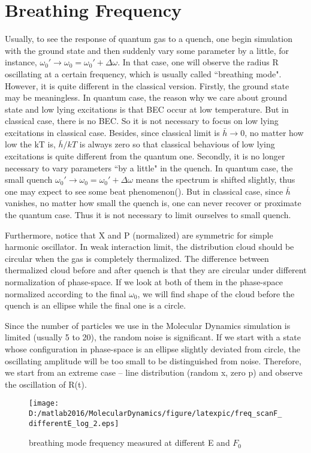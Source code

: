 \documentclass[aps,pre,twocolumn
,groupedaddress]{revtex4-1}
\begin{document}
\begin{comment}
\begin{figure}[hbtp]
\centering
\texttt{[image: D:/matlab2016/MolecularDynamics/figure/Eg1.eps]}
\caption{ground state Energy with $F_0$}
\end{figure}
\end{comment}

\newpage
\section{Breathing Frequency}
Usually, to see the response of quantum gas to a quench, one begin simulation with the ground state and then suddenly vary some parameter by a little, for instance, $\omega_0'\rightarrow\omega_0=\omega_0'+\Delta\omega$. In that case, one will observe the radius R oscillating at a certain frequency, which is usually called ``breathing mode".
However, it is quite different in the classical version. Firstly, the ground state may be meaningless. In quantum case, the reason why we care about ground state and low lying excitations is that BEC occur at low temperature. But in classical case, there is no BEC. So it is not necessary to focus on low lying excitations in classical case. Besides, since classical limit is $\bar{h}\rightarrow 0$, no matter how low the kT is, $\bar{h}/kT$ is always zero so that classical behavious of low lying excitations is quite different from the quantum one. Secondly, it is no longer necessary to vary parameters ``by a little" in the quench. In quantum case, the small quench $\omega_0'\rightarrow\omega_0=\omega_0'+\Delta\omega$ means the spectrum is shifted slightly, thus one may expect to see some beat phenomenon({\color{red}{?}}). But in classical case, since $\bar{h}$ vanishes, no matter how small the quench is, one can never recover or proximate the quantum case. Thus it is not necessary to limit ourselves to small quench. 

Furthermore, notice that X and P (normalized) are symmetric for simple harmonic oscillator. In weak interaction limit, the distribution cloud should be circular when the gas is completely thermalized. The difference between thermalized cloud before and after quench is that they are circular under different normalization of phase-space. If we look at both of them in the phase-space normalized according to the final $\omega_0$, we will find shape of the cloud before the quench is an ellipse while the final one is a circle.

Since the number of particles we use in the Molecular Dynamics simulation is limited (usually 5 to 20), the random noise is significant. If we start with a state whose configuration in phase-space is an ellipse slightly deviated from circle, the oscillating amplitude will be too small to be distinguished from noise. Therefore, we start from an extreme case -- line distribution (random x, zero p) and observe the oscillation of R(t). 
\begin{figure}[hbtp]
\center
\texttt{[image: D:/matlab2016/MolecularDynamics/figure/latexpic/freq\_scanF\_differentE\_log\_2.eps]}
\caption{breathing mode frequency measured at different E and $F_0$}
\label{Breathingfrequency1}
\end{figure}
\end{document}
